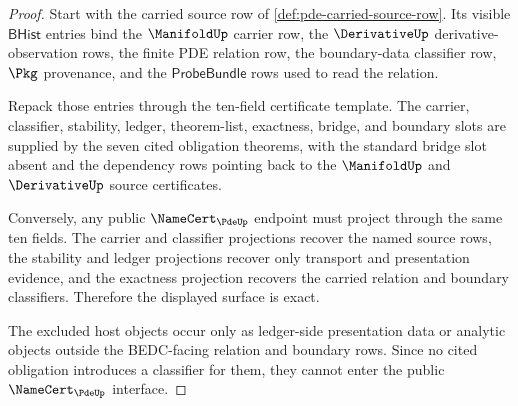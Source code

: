 \begin{proof}
Start with the carried source row of \autoref{def:pde-carried-source-row}. Its visible $\mathsf{BHist}$ entries bind the $\ManifoldUp$ carrier row, the $\DerivativeUp$ derivative-observation rows, the finite PDE relation row, the boundary-data classifier row, $\Pkg$ provenance, and the $\mathsf{ProbeBundle}$ rows used to read the relation.

Repack those entries through the ten-field certificate template. The carrier, classifier, stability, ledger, theorem-list, exactness, bridge, and boundary slots are supplied by the seven cited obligation theorems, with the standard bridge slot absent and the dependency rows pointing back to the $\ManifoldUp$ and $\DerivativeUp$ source certificates.

Conversely, any public $\NameCert_{\PdeUp}$ endpoint must project through the same ten fields. The carrier and classifier projections recover the named source rows, the stability and ledger projections recover only transport and presentation evidence, and the exactness projection recovers the carried relation and boundary classifiers. Therefore the displayed surface is exact.

The excluded host objects occur only as ledger-side presentation data or analytic objects outside the BEDC-facing relation and boundary rows. Since no cited obligation introduces a classifier for them, they cannot enter the public $\NameCert_{\PdeUp}$ interface.
\end{proof}


